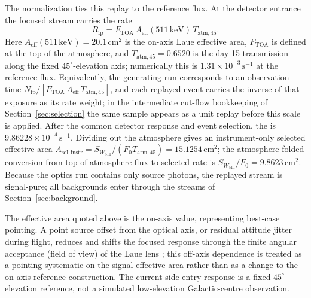 \documentclass[11pt]{article}
\newcommand{\keV}{\ensuremath{\,\mathrm{keV}}}
\newcommand{\cps}{\ensuremath{\,\mathrm{s^{-1}}}}
\newcommand{\wii}{W_{511}}
\newcommand{\aeff}{A_{\mathrm{eff}}}
\newcommand{\fzero}{F_{0}}
\begin{document}
The normalization ties this replay to the reference flux. At the detector
entrance the focused stream carries the rate
\begin{equation}
  R_{\mathrm{fp}}=F_{\mathrm{TOA}}\,\aeff(511\keV)\,T_{\mathrm{atm},45} .
\end{equation}
Here
$\aeff(511\keV)=20.1\,\mathrm{cm^2}$ is the on-axis Laue effective area,
$F_{\mathrm{TOA}}$ is defined at the top of the atmosphere, and
$T_{\mathrm{atm},45}=0.6520$ is the day-15 transmission along the fixed
$45^\circ$-elevation axis; numerically this is $1.31\times10^{-3}\cps$ at the
reference flux.
Equivalently, the generating run corresponds to an observation time
$N_{\mathrm{fp}}/[F_{\mathrm{TOA}}\,\aeff\,T_{\mathrm{atm},45}]$, and each replayed event carries the inverse
of that exposure as its rate weight; in the intermediate cut-flow bookkeeping of
Section~\ref{sec:selection} the same sample appears as a unit replay before this
scale is applied. After the common detector response and event selection, the
 is $9.86228\times10^{-4}\cps$. Dividing out the atmosphere
gives an instrument-only selected effective area
$A_{\mathrm{sel,instr}}=S_{\wii}/(\fzero T_{\mathrm{atm},45})=15.1254\,\mathrm{cm^2}$;
the atmosphere-folded conversion from top-of-atmosphere flux to selected rate is
$S_{\wii}/\fzero=9.8623\,\mathrm{cm^2}$. Because the optics run
contains only source photons, the replayed stream is signal-pure; all
backgrounds enter through the streams of Section~\ref{sec:background}.

The effective area quoted above is the on-axis value, representing best-case
pointing. A point source offset from the optical axis, or residual attitude
jitter during flight, reduces and shifts the focused response through the finite
angular acceptance (field of view) of the Laue lens
\cite{Barriere2009Laue,Weidenspointner2006MAX}; this off-axis dependence is
treated as a pointing systematic on the signal effective area rather than as a
change to the on-axis reference construction. The current side-entry response
is a fixed $45^\circ$-elevation reference, not a simulated
low-elevation Galactic-centre observation.
\end{document}
